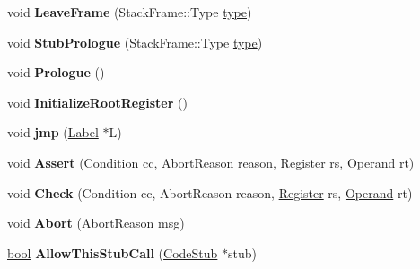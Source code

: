 \begin{DoxyCompactItemize}
void {\bfseries Leave\+Frame} (Stack\+Frame\+::\+Type \mbox{\hyperlink{classstd_1_1conditional_1_1type}{type}})
\item 
\mbox{\label{classv8_1_1internal_1_1TurboAssembler_a2398db9e10af1223aee6d3d491de79e6}} 
void {\bfseries Stub\+Prologue} (Stack\+Frame\+::\+Type \mbox{\hyperlink{classstd_1_1conditional_1_1type}{type}})
\item 
\mbox{\label{classv8_1_1internal_1_1TurboAssembler_aebd70343720df393021ce72e183385b3}} 
void {\bfseries Prologue} ()
\item 
\mbox{\label{classv8_1_1internal_1_1TurboAssembler_a919c742613dc1bcf65b76c2c8dddde57}} 
void {\bfseries Initialize\+Root\+Register} ()
\item 
\mbox{\label{classv8_1_1internal_1_1TurboAssembler_ac9854222d8d5d9aed2704cb2b87919c6}} 
void {\bfseries jmp} (\mbox{\hyperlink{classv8_1_1internal_1_1Label}{Label}} $\ast$L)
\item 
\mbox{\label{classv8_1_1internal_1_1TurboAssembler_ad86c0bbd954aca14fb4af602ed11cb0a}} 
void {\bfseries Assert} (Condition cc, Abort\+Reason reason, \mbox{\hyperlink{classv8_1_1internal_1_1Register}{Register}} rs, \mbox{\hyperlink{classv8_1_1internal_1_1Operand}{Operand}} rt)
\item 
\mbox{\label{classv8_1_1internal_1_1TurboAssembler_a1e86da165a68e2048082eeb0fadebc58}} 
void {\bfseries Check} (Condition cc, Abort\+Reason reason, \mbox{\hyperlink{classv8_1_1internal_1_1Register}{Register}} rs, \mbox{\hyperlink{classv8_1_1internal_1_1Operand}{Operand}} rt)
\item 
\mbox{\label{classv8_1_1internal_1_1TurboAssembler_affb66d8256fd531cd6747647a475a4df}} 
void {\bfseries Abort} (Abort\+Reason msg)
\item 
\mbox{\label{classv8_1_1internal_1_1TurboAssembler_a20348b464d89447388016d14eb6cb7e3}} 
\mbox{\hyperlink{classbool}{bool}} {\bfseries Allow\+This\+Stub\+Call} (\mbox{\hyperlink{classv8_1_1internal_1_1CodeStub}{Code\+Stub}} $\ast$stub)

\end{DoxyCompactItemize}
